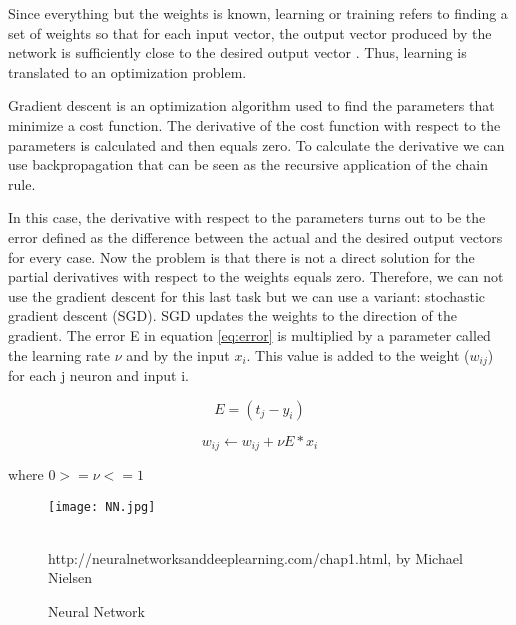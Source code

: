Since everything but the weights is known, learning or training refers to finding a set of weights so that for each input vector, the output vector produced by the network is sufficiently close to the desired output vector \cite{polk2002cognitive}. Thus, learning is translated to an optimization problem.

Gradient descent is an optimization algorithm used to find the parameters  that minimize a cost function. The derivative of the cost function with respect to the parameters is calculated and then equals zero. To calculate the derivative we can use backpropagation that can be seen as the recursive application of the chain rule.

In this case, the derivative with respect to the parameters turns out to be the error defined as the difference between the actual and the desired output vectors for every case. Now the problem is that there is not a direct solution for the partial derivatives with respect to the weights equals zero. Therefore, we can not use the gradient descent for this last task but we can use a variant: stochastic gradient descent (SGD).
SGD updates the weights to the direction of the gradient. The error E in equation \ref{eq:error} is multiplied by a parameter called the learning rate $\nu$ and by the input $x_i$. This value is added to the weight ($w_{ij}$) for each j neuron and input i.

\begin{equation}
\label{eq:error}
E=(t_j - y_i)
\end{equation}

\begin{equation}
\label{eq:weight}
w_{ij} \leftarrow w_{ij}+\nu E * x_i
\end{equation} 
\centerline{where $0>=\nu<=1$ \\}

\begin{figure}
\center
\texttt{[image: NN.jpg]}
\caption{Neural Network}
\label{fig:nn}
\begin{minipage}{12cm}
    \footnotesize
    \center
    \emph \\ http://neuralnetworksanddeeplearning.com/chap1.html, by Michael Nielsen
    \end{minipage}
\end{figure}

